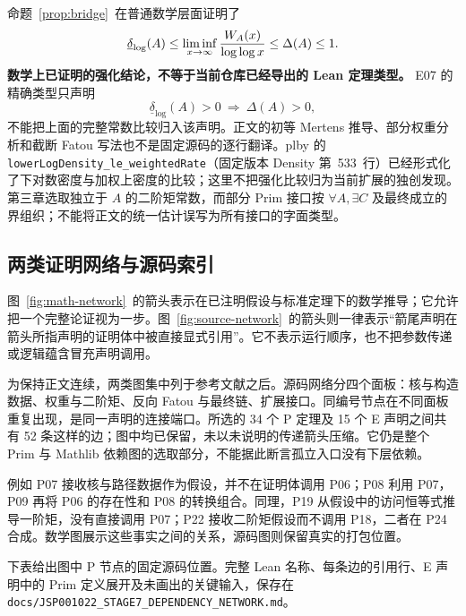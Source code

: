 命题~\ref{prop:bridge}~在普通数学层面证明了
\[
 \underline\delta_{\log}(A)
 \le\liminf_{x\to\infty}\frac{W_A(x)}{\log\log x}
 \le\Delta(A)\le1.
\]
\textbf{数学上已证明的强化结论，不等于当前仓库已经导出的 Lean 定理类型。} E07 的精确类型只声明
\[
 \underline\delta_{\log}(A)>0\ \Longrightarrow\ \Delta(A)>0,
\]
不能把上面的完整常数比较归入该声明。正文的初等 Mertens 推导、部分权重分析和截断 Fatou 写法也不是固定源码的逐行翻译。plby 的 \nolinkurl{lowerLogDensity_le_weightedRate}（固定版本 Density 第~533~行）已经形式化了下对数密度与加权上密度的比较\cite{plby}；这里不把强化比较归为当前扩展的独创发现。第三章选取独立于 $A$ 的二阶矩常数，而部分 Prim 接口按 $\forall A,\exists C$ 及最终成立的界组织；不能将正文的统一估计误写为所有接口的字面类型。

\subsection{两类证明网络与源码索引}
图~\ref{fig:math-network}~的箭头表示在已注明假设与标准定理下的数学推导；它允许把一个完整论证视为一步。图~\ref{fig:source-network}~的箭头则一律表示“箭尾声明在箭头所指声明的证明体中被直接显式引用”。它不表示运行顺序，也不把参数传递或逻辑蕴含冒充声明调用。

为保持正文连续，两类图集中列于参考文献之后。源码网络分四个面板：核与构造数据、权重与二阶矩、反向 Fatou 与最终链、扩展接口。同编号节点在不同面板重复出现，是同一声明的连接端口。所选的 34 个 P 定理及 15 个 E 声明之间共有 52 条这样的边；图中均已保留，未以未说明的传递箭头压缩。它仍是整个 Prim 与 Mathlib 依赖图的选取部分，不能据此断言孤立入口没有下层依赖。

例如 P07 接收核与路径数据作为假设，并不在证明体调用 P06；P08 利用 P07，P09 再将 P06 的存在性和 P08 的转换组合。同理，P19 从假设中的访问恒等式推导一阶矩，没有直接调用 P07；P22 接收二阶矩假设而不调用 P18，二者在 P24 合成。数学图展示这些事实之间的关系，源码图则保留真实的打包位置。


下表给出图中 P 节点的固定源码位置。完整 Lean 名称、每条边的引用行、E 声明中的 Prim 定义展开及未画出的关键输入，保存在
\nolinkurl{docs/JSP001022_STAGE7_DEPENDENCY_NETWORK.md}。

